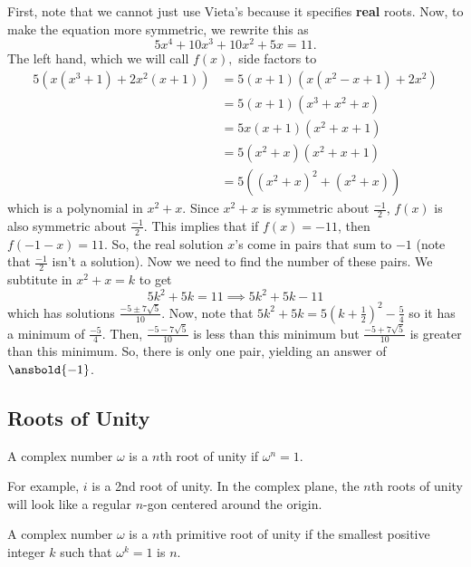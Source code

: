 \documentclass[mast]{lucky}
\begin{document}
\begin{sol}
First, note that we cannot just use Vieta\rq{}s because it specifies \textbf{real} roots. Now, to make the equation more symmetric, we rewrite this as \[5x^4+10x^3+10x^2+5x=11.\] The left hand, which we will call $f(x),$ side factors to
\begin{align*}
5(x(x^3+1)+2x^2(x+1))&=5(x+1)(x(x^2-x+1)+2x^2) \\
&=5(x+1)(x^3+x^2+x) \\
&=5x(x+1)(x^2+x+1) \\
&=5(x^2+x)(x^2+x+1) \\
&=5((x^2+x)^2+(x^2+x))
\end{align*} which is a polynomial in $x^2+x$. Since $x^2+x$ is symmetric about $\frac{-1}{2}$, $f(x)$ is also symmetric about $\frac{-1}{2}$. This implies that if $f(x)=-11$, then $f(-1-x)=11$. So, the real solution $x$\rq{}s come in pairs that sum to $-1$ (note that $\frac{-1}{2}$ isn't a solution). Now we need to find the number of these pairs. We subtitute in $x^2+x=k$ to get \[5k^2+5k=11\implies 5k^2+5k-11\] which has solutions $\frac{-5 \pm 7\sqrt{5}}{10}$. Now, note that $5k^2+5k=5(k+\frac{1}{2})^2-\frac{5}{4}$ so it has a minimum of $\frac{-5}{4}$. Then, $\frac{-5-7\sqrt{5}}{10}$ is less than this minimum but $\frac{-5+7\sqrt{5}}{10}$ is greater than this minimum. So, there is only one pair, yielding an answer of $\ansbold{-1}$.
\end{sol}
\newpage
\subsection{Roots of Unity}

\begin{defi}
A complex number $\omega$ is a $n$th root of unity if $\omega^{n}=1$.
\end{defi}
For example, $i$ is a 2nd root of unity.
In the complex plane, the $n$th roots of unity will look like a regular $n$-gon centered around the origin.

\begin{defi}
A complex number $\omega$ is a $n$th primitive root of unity if the smallest positive integer $k$ such that $\omega^{k}=1$ is $n$.
\end{defi}
\end{document}
